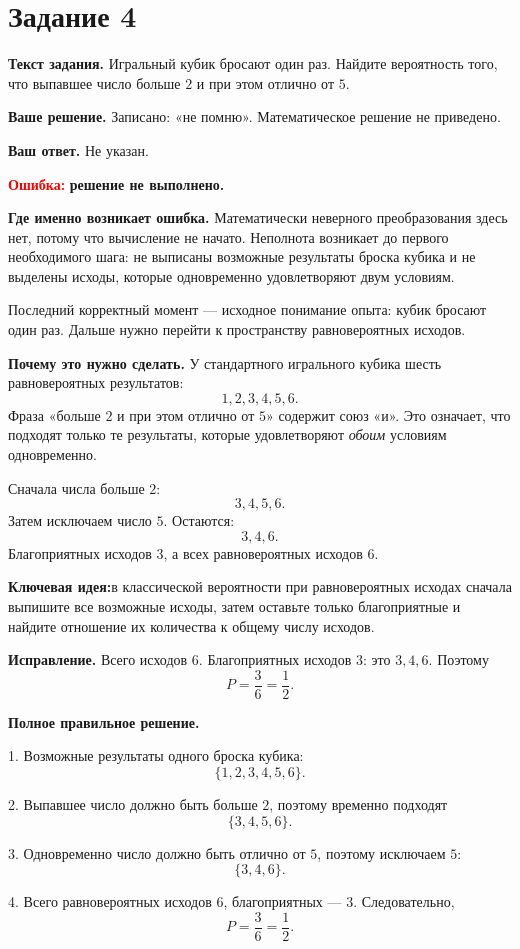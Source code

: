 \documentclass[12pt,a4paper]{article}
\newcommand{\errlabel}[1]{\textcolor{red}{\textbf{Ошибка:}} \textbf{#1}}
\newcommand{\keyidea}{\textcolor{blue!60!black}{\textbf{Ключевая идея:}}}
\begin{document}
\newpage
{}\label{task:4}
\section*{Задание 4}

\textbf{Текст задания.}
Игральный кубик бросают один раз. Найдите вероятность того, что выпавшее число больше $2$ и при этом отлично от $5$.

\textbf{Ваше решение.}
Записано: «не помню». Математическое решение не приведено.

\textbf{Ваш ответ.}
Не указан.

\errlabel{решение не выполнено.}

\textbf{Где именно возникает ошибка.}
Математически неверного преобразования здесь нет, потому что вычисление не начато. Неполнота возникает до первого необходимого шага: не выписаны возможные результаты броска кубика и не выделены исходы, которые одновременно удовлетворяют двум условиям.

Последний корректный момент --- исходное понимание опыта: кубик бросают один раз. Дальше нужно перейти к пространству равновероятных исходов.

\textbf{Почему это нужно сделать.}
У стандартного игрального кубика шесть равновероятных результатов:
\[
1,2,3,4,5,6.
\]
Фраза «больше $2$ и при этом отлично от $5$» содержит союз «и». Это означает, что подходят только те результаты, которые удовлетворяют \emph{обоим} условиям одновременно.

Сначала числа больше $2$:
\[
3,4,5,6.
\]
Затем исключаем число $5$. Остаются:
\[
3,4,6.
\]
Благоприятных исходов $3$, а всех равновероятных исходов $6$.

\keyidea в классической вероятности при равновероятных исходах сначала выпишите все возможные исходы, затем оставьте только благоприятные и найдите отношение их количества к общему числу исходов.

\textbf{Исправление.}
Всего исходов $6$. Благоприятных исходов $3$: это $3,4,6$. Поэтому
\[
P=\frac{3}{6}=\frac12.
\]

\textbf{Полное правильное решение.}

1. Возможные результаты одного броска кубика:
\[
\{1,2,3,4,5,6\}.
\]

2. Выпавшее число должно быть больше $2$, поэтому временно подходят
\[
\{3,4,5,6\}.
\]

3. Одновременно число должно быть отлично от $5$, поэтому исключаем $5$:
\[
\{3,4,6\}.
\]

4. Всего равновероятных исходов $6$, благоприятных --- $3$. Следовательно,
\[
P=\frac{3}{6}=\frac12.
\]
\end{document}
